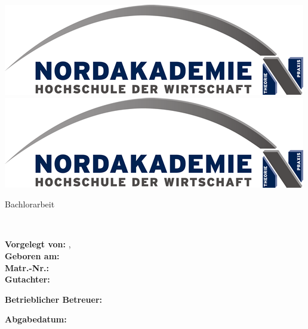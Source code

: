 \thispagestyle{empty}
\vspace{2cm}
\begin{center}
\includegraphics[scale=1]{images/uni-logo} \hspace{3cm} 
\includegraphics[scale=1]{images/uni-logo} %
\\\vspace{2cm}

\Huge{\dctitle}

\vspace{1cm}
\Large{Bachlorarbeit}

\vspace{5mm}
\large{\dcfaculty\\ \dcuniversity}
\vspace{3.5	cm}
\end{center}
{\large
\begin{flushleft}
\textbf{Vorgelegt von:} \dcauthorsurname, \dcauthorname \\
\textbf{Geboren am:} \dcauthoradd\\
\textbf{Matr.-Nr.:} \dcauthorno \\
\textbf{Gutachter:} \\
\begin{tightlist}
	\item \dcapprovala
	\item \dcapprovalb
\end{tightlist}

\textbf{Betrieblicher Betreuer:} \\
\begin{tightlist}
	\item \dcada
\end{tightlist}
\vspace{5mm}
\textbf{Abgabedatum:} \dcdatesubmitted\\
\end{flushleft}
}
\vspace{1cm}

\newpage
